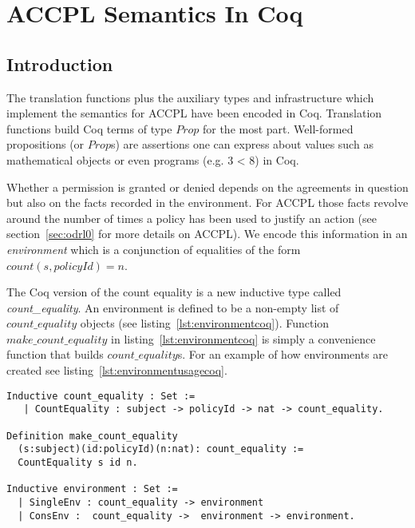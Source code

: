\chapter{ACCPL Semantics In Coq}\label{chap:accplsemanticscoq}


\section{Introduction}
\label{sec:envConsistentP}  

The translation functions plus the auxiliary types and infrastructure which implement the semantics for \ac{ACCPL} have been encoded in Coq. Translation functions build Coq terms of type $Prop$ for the most part. Well-formed propositions (or $Prop$s) are assertions one can express about values such as mathematical objects or even programs (e.g. 3 < 8) in Coq. 

Whether a permission is granted or denied depends on the agreements in question but also on the facts recorded in the environment. For \ac{ACCPL} those facts revolve around the number of times a policy has been used to justify an action (see section~\ref{sec:odrl0} for more details on \ac{ACCPL}). We encode this information in an \emph{environment} which is a conjunction of equalities of the form $count(s, policyId) = n$. 

The Coq version of the count equality is a new inductive type called \emph{count\_equality}. An environment is defined to be a non-empty list of $count\_equality$ objects (see listing~\ref{lst:environmentcoq}). Function $make\_count\_equality$ in listing~\ref{lst:environmentcoq} is simply a convenience function that builds $count\_equality$s. For an example of how environments are created see listing~\ref{lst:environmentusagecoq}.

\begin{lstlisting}
Inductive count_equality : Set := 
   | CountEquality : subject -> policyId -> nat -> count_equality.

Definition make_count_equality
  (s:subject)(id:policyId)(n:nat): count_equality :=
  CountEquality s id n.
  
Inductive environment : Set := 
  | SingleEnv : count_equality -> environment
  | ConsEnv :  count_equality ->  environment -> environment.

\end{lstlisting}

